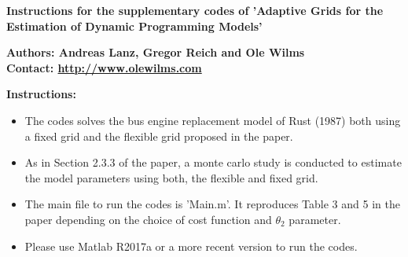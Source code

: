 \documentclass[12pt]{article}
\begin{document}
\begin{center}
\Large{
\textbf{Instructions for the supplementary codes of 'Adaptive Grids for the Estimation of Dynamic Programming Models'} \\[10pt]
}


\textbf{Authors: Andreas Lanz, Gregor Reich and Ole Wilms}\\
\textbf{Contact: \url{http://www.olewilms.com}}

\end{center}

\noindent \textbf{Instructions:}

\begin{itemize}
	\item The codes solves the bus engine replacement model of  Rust (1987) both using a fixed grid and the flexible grid proposed in the paper.
	
	\item As in Section 2.3.3 of the paper, a monte carlo study is conducted to estimate the model parameters using both, the flexible and fixed grid.
	
	\item The main file to run the codes is 'Main.m'. It reproduces Table 3 and 5 in the paper depending on the choice of cost function and $\theta_2$ parameter.
	
	\item Please use Matlab R2017a or a more recent version to run the codes. 
\end{itemize}
\end{document}
